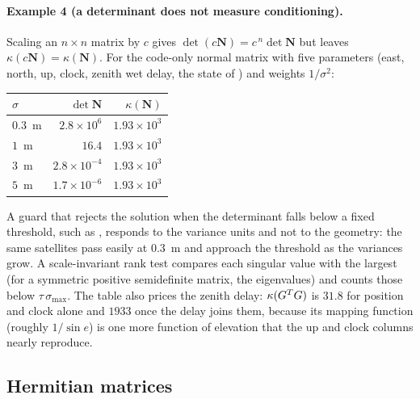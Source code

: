 \documentclass[main.tex]{subfiles}
\begin{document}
\paragraph{Example 4 (a determinant does not measure conditioning).}
\label{la:ex4}%
Scaling an $n \times n$ matrix by $c$ gives $\det(c\bm{N}) = c^{\,n}\det\bm{N}$
but leaves $\kappa(c\bm{N}) = \kappa(\bm{N})$.  For the code-only normal
matrix with five parameters (east, north, up, clock, zenith wet delay, the
state of ) and weights $1/\sigma^2$:
\begin{center}
\small
\begin{tabular}{@{}lrr@{}}
\toprule
$\sigma$ & $\det\bm{N}$ & $\kappa(\bm{N})$ \\
\midrule
$0.3$~m & $2.8\times10^{6}$  & $1.93\times10^{3}$ \\
$1$~m   & $16.4$             & $1.93\times10^{3}$ \\
$3$~m   & $2.8\times10^{-4}$ & $1.93\times10^{3}$ \\
$5$~m   & $1.7\times10^{-6}$ & $1.93\times10^{3}$ \\
\bottomrule
\end{tabular}
\end{center}
A guard that rejects the solution when the determinant falls below a fixed
threshold, such as , responds to the variance units and not to the geometry: the
same satellites pass easily at $0.3$~m and approach the threshold as the
variances grow.  A scale-invariant rank test compares each singular value
with the largest (for a symmetric positive semidefinite matrix, the
eigenvalues) and counts those below $\tau\,\sigma_{\max}$.  The table also
prices the zenith delay: $\kappa(G^{T}G)$ is $31.8$ for position
and clock alone and $1933$ once the delay joins them, because its mapping
function (roughly $1/\sin e$) is one more function of elevation that the up
and clock columns nearly reproduce.

\subsection{Hermitian matrices}\label{sec:la-hermitian}
\end{document}
